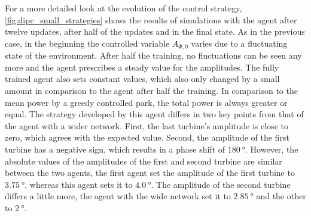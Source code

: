 For a more detailed look at the evolution of the control strategy, \autoref{fig:dipc_small_strategies} shows the results of simulations with the agent after twelve updates, after half of the updates and in the final state. As in the previous case, in the beginning the controlled variable $A_{\Phi,0}$ varies due to a fluctuating state of the environment. After half the training, no fluctuations can be seen any more and the agent prescribes a steady value for the amplitudes. The fully trained agent also sets constant values, which also only changed by a small amount in comparison to the agent after half the training. In comparison to the mean power by a greedy controlled park, the total power is always greater or equal. The strategy developed by this agent differs in two key points from that of the agent with a wider network. First, the last turbine's amplitude is close to zero, which agrees with the expected value. Second, the amplitude of the first turbine has a negative sign, which results in a phase shift of $\SI{180}{\degree}$. However, the absolute values of the amplitudes of the first and second turbine are similar between the two agents, the first agent set the amplitude of the first turbine to $\SI{3.75}{\degree}$, whereas this agent sets it to $\SI{4.0}{\degree}$. The amplitude of the second turbine differs a little more, the agent with the wide network set it to $\SI{2.85}{\degree}$ and the other to $\SI{2}{\degree}$. 

